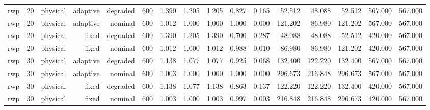 \begin{tabular}{lrrrrrrrrrrrrrrr}
rwp & 20 & physical & adaptive & degraded & 600 & 1.390 & 1.205 & 1.205 & 0.827 & 0.165 & 52.512 & 48.088 & 52.512 & 567.000 & 567.000 \\
rwp & 20 & physical & adaptive & nominal & 600 & 1.012 & 1.000 & 1.000 & 1.000 & 0.000 & 121.202 & 86.980 & 121.202 & 567.000 & 567.000 \\
rwp & 20 & physical & fixed & degraded & 600 & 1.390 & 1.205 & 1.390 & 0.700 & 0.287 & 48.088 & 48.088 & 52.512 & 420.000 & 567.000 \\
rwp & 20 & physical & fixed & nominal & 600 & 1.012 & 1.000 & 1.012 & 0.988 & 0.010 & 86.980 & 86.980 & 121.202 & 420.000 & 567.000 \\
rwp & 30 & physical & adaptive & degraded & 600 & 1.138 & 1.077 & 1.077 & 0.925 & 0.068 & 132.400 & 122.220 & 132.400 & 567.000 & 567.000 \\
rwp & 30 & physical & adaptive & nominal & 600 & 1.003 & 1.000 & 1.000 & 1.000 & 0.000 & 296.673 & 216.848 & 296.673 & 567.000 & 567.000 \\
rwp & 30 & physical & fixed & degraded & 600 & 1.138 & 1.077 & 1.138 & 0.863 & 0.137 & 122.220 & 122.220 & 132.400 & 420.000 & 567.000 \\
rwp & 30 & physical & fixed & nominal & 600 & 1.003 & 1.000 & 1.003 & 0.997 & 0.003 & 216.848 & 216.848 & 296.673 & 420.000 & 567.000 \\
\bottomrule
\end{tabular}